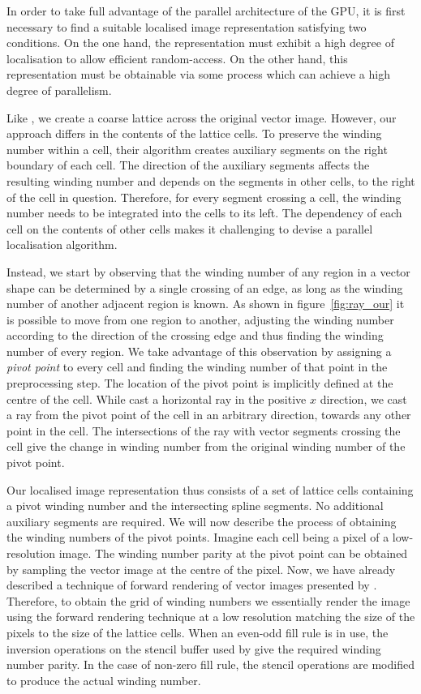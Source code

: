 \documentclass[11pt,a4paper,twoside]{article}
\begin{document}
In order to take full advantage of the parallel architecture of the GPU, it is first necessary to find a suitable localised image representation satisfying two conditions. On the one hand, the representation must exhibit a high degree of localisation to allow efficient random-access. On the other hand, this representation must be obtainable via some process which can achieve a high degree of parallelism. 

Like \cite{NehabHoppe08}, we create a coarse lattice across the original vector image. However, our approach differs in the contents of the lattice cells. To preserve the winding number within a cell, their algorithm creates auxiliary segments on the right boundary of each cell. The direction of the auxiliary segments affects the resulting winding number and depends on the segments in other cells, to the right of the cell in question. Therefore, for every segment crossing a cell, the winding number needs to be integrated into the cells to its left. The dependency of each cell on the contents of other cells makes it challenging to devise a parallel localisation algorithm.

Instead, we start by observing that the winding number of any region in a vector shape can be determined by a single crossing of an edge, as long as the winding number of another adjacent region is known. As shown in figure~\ref{fig:ray_our} it is possible to move from one region to another, adjusting the winding number according to the direction of the crossing edge and thus finding the winding number of every region. We take advantage of this observation by assigning a \emph{pivot point} to every cell and finding the winding number of that point in the preprocessing step. The location of the pivot point is implicitly defined at the centre of the cell. While \cite{NehabHoppe08} cast a horizontal ray in the positive $x$ direction, we cast a ray from the pivot point of the cell in an arbitrary direction, towards any other point in the cell. The intersections of the ray with vector segments crossing the cell give the change in winding number from the original winding number of the pivot point.

Our localised image representation thus consists of a set of lattice cells containing a pivot winding number and the intersecting spline segments. No additional auxiliary segments are required. We will now describe the process of obtaining the winding numbers of the pivot points. Imagine each cell being a pixel of a low-resolution image. The winding number parity at the pivot point can be obtained by sampling the vector image at the centre of the pixel. Now, we have already described a technique of forward rendering of vector images presented by \cite{Kokojima06}. Therefore, to obtain the grid of winding numbers we essentially render the image using the forward rendering technique at a low resolution matching the size of the pixels to the size of the lattice cells. When an even-odd fill rule is in use, the inversion operations on the stencil buffer used by \cite{Kokojima06} give the required winding number parity. In the case of non-zero fill rule, the stencil operations are modified to produce the actual winding number.
\end{document}
